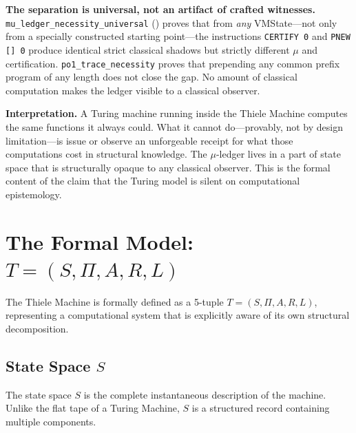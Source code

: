 \textbf{The separation is universal, not an artifact of crafted witnesses.} \texttt{mu\_ledger\_necessity\_universal} () proves that from \emph{any} VMState---not only from a specially constructed starting point---the instructions \texttt{CERTIFY 0} and \texttt{PNEW [] 0} produce identical strict classical shadows but strictly different $\mu$ and certification. \texttt{po1\_trace\_necessity} proves that prepending any common prefix program of any length does not close the gap. No amount of classical computation makes the ledger visible to a classical observer.

\textbf{Interpretation.} A Turing machine running inside the Thiele Machine computes the same functions it always could. What it cannot do---provably, not by design limitation---is issue or observe an unforgeable receipt for what those computations cost in structural knowledge. The $\mu$-ledger lives in a part of state space that is structurally opaque to any classical observer. This is the formal content of the claim that the Turing model is silent on computational epistemology.

\section{The Formal Model: $T = (S, \Pi, A, R, L)$}

The Thiele Machine is formally defined as a 5-tuple $T = (S, \Pi, A, R, L)$, representing a computational system that is explicitly aware of its own structural decomposition.

\subsection{State Space $S$}

The state space $S$ is the complete instantaneous description of the machine. Unlike the flat tape of a Turing Machine, $S$ is a structured record containing multiple components.

